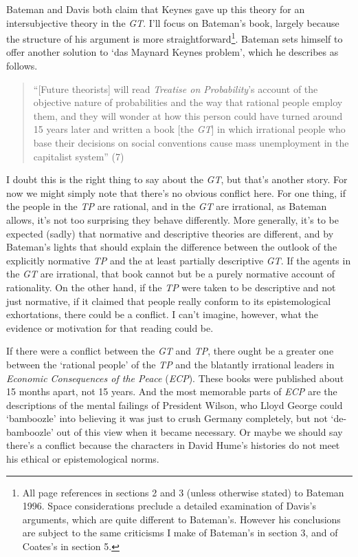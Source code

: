 \documentclass[
  10pt,
  letterpaper,
  DIV=11,
  numbers=noendperiod,
  twoside]{scrartcl}
\begin{document}
Bateman and Davis both claim that Keynes gave up this theory for an
intersubjective theory in the \emph{GT}. I'll focus on Bateman's book,
largely because the structure of his argument is more
straightforward\footnote{All page references in sections 2 and 3 (unless
  otherwise stated) to Bateman 1996. Space considerations preclude a
  detailed examination of Davis's arguments, which are quite different
  to Bateman's. However his conclusions are subject to the same
  criticisms I make of Bateman's in section 3, and of Coates's in
  section 5.}. Bateman sets himself to offer another solution to `das
Maynard Keynes problem', which he describes as follows.

\begin{quote}
``{[}Future theorists{]} will read \emph{Treatise on Probability}'s
account of the objective nature of probabilities and the way that
rational people employ them, and they will wonder at how this person
could have turned around 15 years later and written a book {[}the
\emph{GT}{]} in which irrational people who base their decisions on
social conventions cause mass unemployment in the capitalist system''
(7)
\end{quote}

I doubt this is the right thing to say about the \emph{GT}, but that's
another story. For now we might simply note that there's no obvious
conflict here. For one thing, if the people in the \emph{TP} are
rational, and in the \emph{GT} are irrational, as Bateman allows, it's
not too surprising they behave differently. More generally, it's to be
expected (sadly) that normative and descriptive theories are different,
and by Bateman's lights that should explain the difference between the
outlook of the explicitly normative \emph{TP} and the at least partially
descriptive \emph{GT}. If the agents in the \emph{GT} are irrational,
that book cannot but be a purely normative account of rationality. On
the other hand, if the \emph{TP} were taken to be descriptive and not
just normative, if it claimed that people really conform to its
epistemological exhortations, there could be a conflict. I can't
imagine, however, what the evidence or motivation for that reading could
be.

If there were a conflict between the \emph{GT} and \emph{TP}, there
ought be a greater one between the `rational people' of the \emph{TP}
and the blatantly irrational leaders in \emph{Economic Consequences of
the Peace} (\emph{ECP}). These books were published about 15 months
apart, not 15 years. And the most memorable parts of \emph{ECP} are the
descriptions of the mental failings of President Wilson, who Lloyd
George could `bamboozle' into believing it was just to crush Germany
completely, but not `de-bamboozle' out of this view when it became
necessary. Or maybe we should say there's a conflict because the
characters in David Hume's histories do not meet his ethical or
epistemological norms.
\end{document}
